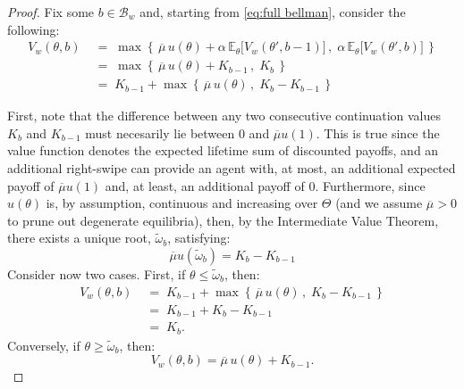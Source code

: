 \begin{proof}
    Fix some $b\in\mathcal{B}_w$ and, starting from \autoref{eq:full bellman}, consider the following:
    \begin{equation*}
        \begin{aligned} 
            V_w(\theta,b) \;&=\;\max\left\{\,\overline{\mu} \, u(\theta) +\alpha \,\mathbb{E}_\theta \Big[V_w(\theta', b-1)\Big]\,,\; \alpha\,\mathbb{E}_\theta \Big[ V_w(\theta', b)\Big]\,\right\}\\
            &=\; \max\left\{\,\overline{\mu} \, u(\theta) + K_{b-1} \,,\; K_b \,\right\}\\
            &=\; K_{b-1} + \max\left\{\,\overline{\mu} \, u(\theta) \,,\; K_b - K_{b-1}\,\right\}
        \end{aligned}
    \end{equation*}
    
    First, note that the difference between any two consecutive continuation values $K_b$ and $K_{b-1}$ must necesarily lie between 0 and $\overline{\mu}u(1)$. 
    This is true since the value function denotes the expected lifetime sum of discounted payoffs, and an additional right-swipe can provide an agent with, at most, an additional expected payoff of $\overline{\mu}u(1)$ and, at least, an additional payoff of $0$.
    Furthermore, since $u(\theta)$ is, by assumption, continuous and increasing over $\Theta$ (and we assume $\overline\mu>0$ to prune out degenerate equilibria), then, by the Intermediate Value Theorem, there exists a unique root, $\widetilde\omega_b$, satisfying:
    \begin{equation*} 
            \overline\mu u(\widetilde\omega_b) = K_b-K_{b-1}   
    \end{equation*}
    Consider now two cases. First, if $\theta\leq\widetilde\omega_b$, then:
    \begin{equation*}
        \begin{aligned} 
            V_w(\theta,b) \;&=\; K_{b-1} + \max\left\{\,\overline{\mu} \, u(\theta) \,,\; K_b - K_{b-1}\,\right\}\\
            &=\; K_{b-1} + K_b - K_{b-1}\\
            &=\; K_b.
        \end{aligned}
    \end{equation*}
    Conversely, if $\theta\geq\widetilde\omega_b$, then:
    \begin{equation*}
        V_w(\theta,b) = \overline{\mu} \, u(\theta) + K_{b-1}. 
    \end{equation*} 


\end{proof}
